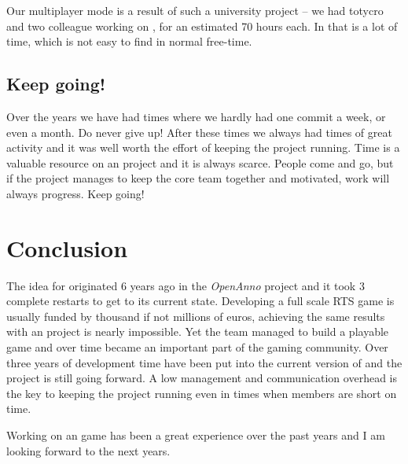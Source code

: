 Our multiplayer mode is a result of such a university project -- we had totycro and two colleague working on \UH{}, for an
estimated 70 hours each. In \OS{} that is a lot of time, which is not easy to find in normal free-time.

\subsection{Keep going!}
Over the years we have had times where we hardly had one commit a week, or even a month. Do never give up! After these
times we always had times of great activity and it was well worth the effort of keeping the project running. Time is a
valuable resource on an \OS{} project and it is always scarce. People come and go, but if the project manages to keep
the core team together and motivated, work will always progress. Keep going!

\section{Conclusion}
The idea for \UH{} originated 6 years ago in the \textit{OpenAnno} project and it took 3 complete restarts to get to its
current state. Developing
a full scale RTS game is usually funded by thousand if not millions of euros, achieving the same results with an \OS{}
project is nearly impossible. Yet the team managed to build a playable game and over time became an important part of
the \OS{} gaming community. Over three years of development time have been put into the current version of \UH{} and the
project is still going forward. A low management and communication overhead is the key to keeping the project running
even in times when members are short on time.

Working on an \OS{} game has been a great experience over the past years and I am looking forward to the next years.



